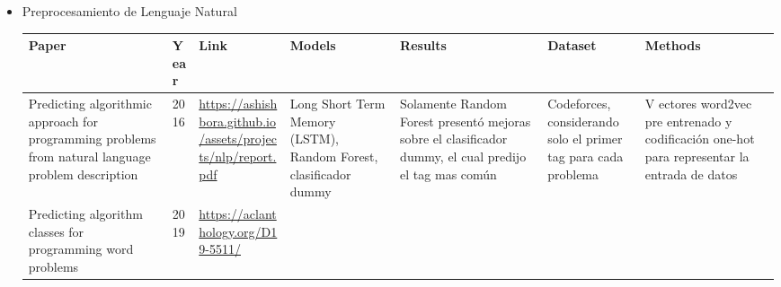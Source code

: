 \documentclass{article}
\begin{document}
\begin{itemize}
    \item Preprocesamiento de Lenguaje Natural
          
          \begin{longtable}{|p{2cm}|p{0.8cm}|p{2cm}|p{2cm}|p{3cm}|p{2cm}|p{3cm}|}
              \hline
              \textbf{Paper} & \textbf{Year}                                                                                                                                                       & \textbf{Link} & \textbf{Models} & \textbf{Results} & \textbf{Dataset} & \textbf{Methods} \\
              \hline
              \endfirsthead
              
              \hline
              \endfoot
              
              \hline
              \endlastfoot
              
              
              Predicting algorithmic approach for programming problems from natural language problem description 
                             & 2016 
                             & \href{https://ashishbora.github.io/assets/projects/nlp/report.pdf}{\url{https://ashishbora.github.io/assets/projects/nlp/report.pdf}}

              
              
              
              
              
                             & Long Short Term Memory (LSTM), Random Forest, clasificador dummy
                             & Solamente Random Forest presentó mejoras sobre el clasificador dummy, el cual predijo el tag mas común
                             & Codeforces, considerando solo el primer tag para cada problema
                             & V ectores word2vec pre entrenado y codificación one-hot para representar la entrada de datos                                                                                                                                                                             \\
              
              \hline
              Predicting algorithm classes for programming word problems
                             & 2019
                             & \href{https://aclanthology.org/D19-5511/}{\url{https://aclanthology.org/D19-5511/}}

              
              
              
              

\end{longtable}
\end{itemize}
\end{document}
